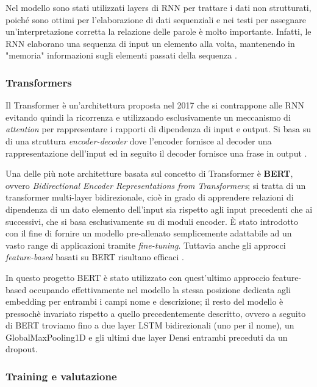 Nel modello sono stati utilizzati layers di RNN per trattare i dati non
strutturati, poiché sono ottimi per l'elaborazione di dati sequenziali e nei
testi per assegnare un'interpretazione corretta la relazione delle parole è
molto importante. Infatti, le RNN elaborano una sequenza di input un elemento
alla volta, mantenendo in "memoria" informazioni sugli elementi passati della
sequenza \cite{liang2017text}.

\subsubsection{Transformers}
Il Transformer è un'architettura proposta nel 2017 che si contrappone alle RNN
evitando quindi la ricorrenza e utilizzando esclusivamente un meccanismo di
\textit{attention} per rappresentare i rapporti di dipendenza di input e output.
Si basa su di una struttura \textit{encoder-decoder} dove l'encoder fornisce al
decoder una rappresentazione dell'input ed in seguito il decoder fornisce una
frase in output \cite{vaswani2017attention}.


Una delle più note architetture basata sul concetto di Transformer è
\textbf{BERT}, ovvero \textit{Bidirectional Encoder Representations from
Transformers}; si tratta di un transformer multi-layer bidirezionale, cioè in
grado di apprendere relazioni di dipendenza di un dato elemento dell'input sia
rispetto agli input precedenti che ai successivi, che si basa esclusivamente su
di moduli encoder. È stato introdotto con il fine di fornire un modello
pre-allenato semplicemente adattabile ad un vasto range di applicazioni tramite
\textit{fine-tuning}. Tuttavia anche gli approcci \textit{feature-based} basati
su BERT risultano efficaci \cite{devlin2018bert}.

In questo progetto BERT è stato utilizzato con quest'ultimo approccio
feature-based occupando effettivamente nel modello la stessa posizione dedicata
agli embedding per entrambi i campi nome e descrizione; il resto del modello è
pressochè invariato rispetto a quello precedentemente descritto, ovvero a
seguito di BERT troviamo fino a due layer LSTM bidirezionali (uno per il nome),
un GlobalMaxPooling1D e gli ultimi due layer Densi entrambi preceduti da un
dropout.

\subsubsection{Training e valutazione}

